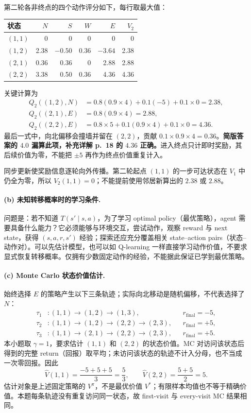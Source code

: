 \begin{checkedsolution}
第二轮各非终点的四个动作评分如下，每行取最大值：
\begin{center}
\begin{tabular}{@{}lrrrrr@{}}
  \toprule
  状态 & $N$ & $S$ & $W$ & $E$ & $V_2$ \\
  \midrule
  $(1,1)$ & 0 & 0 & 0 & 0 & 0 \\
  $(1,2)$ & 2.38 & $-0.50$ & 0.36 & $-3.64$ & 2.38 \\
  $(2,1)$ & 0.36 & 0.36 & 0 & 2.88 & 2.88 \\
  $(2,2)$ & 3.38 & 0.50 & 0.36 & 4.36 & 4.36 \\
  \bottomrule
\end{tabular}
\end{center}
关键计算为
\[
\begin{aligned}
  Q_2((1,2),N)&=0.8(0.9\times4)+0.1(-5)+0.1\times0=2.38,\\
  Q_2((2,1),E)&=0.8(0.9\times4)=2.88,\\
  Q_2((2,2),E)&=0.8\times5+0.1(0.9\times4)+0.1\times0=4.36.
\end{aligned}
\]
最后一式中，向北偏移会撞墙并留在 $(2,2)$，贡献 $0.1\times0.9\times4=0.36$。\textbf{简版答案的 $4.0$ 漏算此项，补充详解 p.~18 的 $4.36$ 正确。}进入终点只计即时奖励，其后续价值为零，不能把 $\pm5$ 再作为终点价值重复计入。

同步更新使奖励信息逐轮向外传播。第二轮起点 $(1,1)$ 的一步可达状态在 $V_1$ 中仍全为零，所以 $V_2(1,1)=0$；不能提前使用邻居新算出的 $2.38$ 或 $2.88$。

\paragraph{(b) 未知转移概率时的学习条件.}
问题是：若不知道 $T(s'\mid s,a)$，为了学习 optimal policy（最优策略），agent 需要具备什么能力？它必须能够与环境交互，尝试动作，观察 reward 与 next state，获得 $(s,a,r,s')$ 经验；探索还应充分覆盖相关 state--action pairs（状态--动作对）。可以先估计模型，也可以如 Q-learning 一样直接学习动作价值，不要求显式恢复转移概率。仅拥有少数固定动作的经验，不能据此保证已学到最优策略。

\paragraph{(c) Monte Carlo 状态价值估计.}
始终选择 $E$ 的策略产生以下三条轨迹；实际向北移动是随机偏移，不代表选择了 $N$：
\[
\begin{aligned}
  \tau_1 &: (1,1)\to(1,2)\to(1,3), && r_{\mathrm{final}}=-5,\\
  \tau_2 &: (1,1)\to(1,2)\to(2,2)\to(2,3), && r_{\mathrm{final}}=+5,\\
  \tau_3 &: (1,1)\to(2,1)\to(2,2)\to(2,3), && r_{\mathrm{final}}=+5.
\end{aligned}
\]
本小题取 $\gamma=1$，要求估计 $(1,1)$ 和 $(2,2)$ 的状态价值。MC 对访问该状态后得到的完整 return（回报）取平均；未访问该状态的轨迹不计入分母，也不当成一次零回报。因此
\[
  \boxed{\widehat V(1,1)=\frac{-5+5+5}{3}=\frac53},\qquad
  \boxed{\widehat V(2,2)=\frac{5+5}{2}=5}.
\]
估计对象是上述固定策略的 $V^\pi$，不是最优价值 $V^*$；有限样本均值也不等于精确价值。本题每条轨迹没有重复访问同一状态，故 first-visit 与 every-visit MC 结果相同。


\end{checkedsolution}
